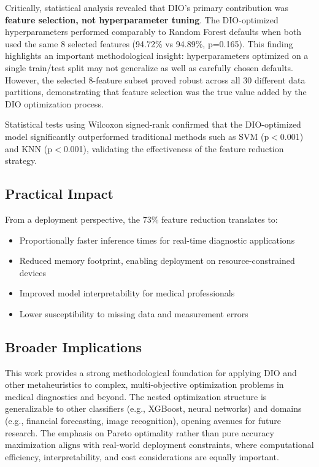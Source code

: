 \documentclass[12pt, a4paper]{article}
\begin{document}
Critically, statistical analysis revealed that DIO's primary contribution was \textbf{feature selection, not hyperparameter tuning}. The DIO-optimized hyperparameters performed comparably to Random Forest defaults when both used the same 8 selected features (94.72\% vs 94.89\%, p=0.165). This finding highlights an important methodological insight: hyperparameters optimized on a single train/test split may not generalize as well as carefully chosen defaults. However, the selected 8-feature subset proved robust across all 30 different data partitions, demonstrating that feature selection was the true value added by the DIO optimization process.

Statistical tests using Wilcoxon signed-rank confirmed that the DIO-optimized model significantly outperformed traditional methods such as SVM (p$<$0.001) and KNN (p$<$0.001), validating the effectiveness of the feature reduction strategy.

\subsection{Practical Impact}
From a deployment perspective, the 73\% feature reduction translates to:
\begin{itemize}
    \item Proportionally faster inference times for real-time diagnostic applications
    \item Reduced memory footprint, enabling deployment on resource-constrained devices
    \item Improved model interpretability for medical professionals
    \item Lower susceptibility to missing data and measurement errors
\end{itemize}

\subsection{Broader Implications}
This work provides a strong methodological foundation for applying DIO and other metaheuristics to complex, multi-objective optimization problems in medical diagnostics and beyond. The nested optimization structure is generalizable to other classifiers (e.g., XGBoost, neural networks) and domains (e.g., financial forecasting, image recognition), opening avenues for future research. The emphasis on Pareto optimality rather than pure accuracy maximization aligns with real-world deployment constraints, where computational efficiency, interpretability, and cost considerations are equally important.
\end{document}
